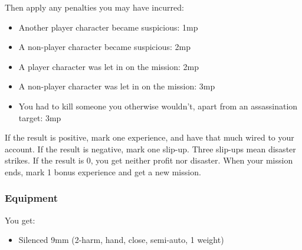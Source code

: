 Then apply any penalties you may have incurred:
\begin{itemize}
\item Another player character became suspicious: 1mp
\item A non-player character became suspicious: 2mp
\item A player character was let in on the mission: 2mp
\item A non-player character was let in on the mission: 3mp
\item You had to kill someone you otherwise wouldn't, apart from an assassination target: 3mp
\end{itemize}

If the result is positive, mark one experience, and have that much \money wired to your account. If the result is negative, mark one slip-up. Three slip-ups mean disaster strikes. If the result is 0, you get neither profit nor disaster. When your mission ends, mark 1 bonus experience and get a new mission.



\subsubsection{Equipment}
You get:
\begin{itemize}
\item Silenced 9mm (2-harm, hand, close, semi-auto, 1 weight)
\end{itemize}


